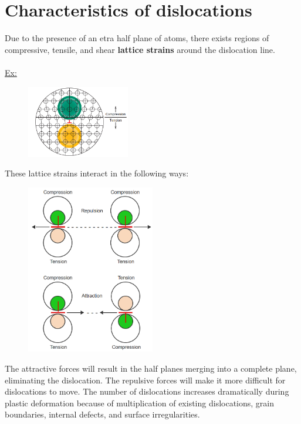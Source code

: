 \documentclass[12pt]{article}
\begin{document}
\section*{Characteristics of dislocations}
Due to the presence of an etra half plane of atoms, there exists regions of compressive, tensile, and shear \textbf{lattice strains} around the dislocation line. \\\\
\underline{Ex:}
\begin{figure}[H]
    \centering
    \includegraphics[width=0.4\textwidth]{lattice strain.png}
\end{figure}
These lattice strains interact in the following ways:
\begin{figure}[H]
    \centering
    \includegraphics[width=0.5\textwidth]{interaction.png}
\end{figure}
\noindent
The attractive forces will result in the half planes merging into a complete plane, eliminating the dislocation. The repulsive forces will make it more difficult for dislocations to move. The number of dislocations increases dramatically during plastic deformation because of multiplication of existing dislocations, grain boundaries, internal defects, and surface irregularities.
\end{document}
